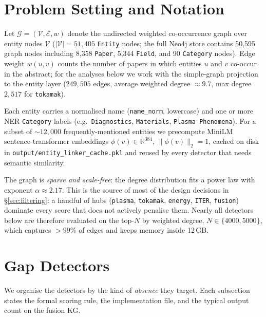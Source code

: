 \documentclass[11pt,a4paper]{article}
\newcommand{\KG}{\mathcal{G}}
\newcommand{\Entset}{\mathcal{E}}
\newcommand{\Vset}{\mathcal{V}}
\newcommand{\code}[1]{\texttt{\small #1}}
\begin{document}
\section{Problem Setting and Notation}
\label{sec:setup}

Let $\KG = (\Vset, \Entset, w)$ denote the undirected weighted co-occurrence graph over entity nodes $\Vset$ ($|\Vset|=51{,}405$ \code{Entity} nodes; the full Neo4j store contains 50{,}595 graph nodes including 8{,}358 \code{Paper}, 5{,}344 \code{Field}, and 90 \code{Category} nodes). Edge weight $w(u,v)$ counts the number of papers in which entities $u$ and $v$ co-occur in the abstract; for the analyses below we work with the simple-graph projection to the entity layer ($249{,}505$ edges, average weighted degree $\approx 9.7$, max degree $2{,}517$ for \code{tokamak}).

Each entity carries a normalised name (\code{name\_norm}, lowercase) and one or more NER \code{Category} labels (e.g.\ \code{Diagnostics}, \code{Materials}, \code{Plasma Phenomena}). For a subset of $\sim\!12{,}000$ frequently-mentioned entities we precompute MiniLM \citep{wang2020minilm} sentence-transformer embeddings $\phi(v)\in\mathbb{R}^{384}$, $\|\phi(v)\|_2=1$, cached on disk in \code{output/entity\_linker\_cache.pkl} and reused by every detector that needs semantic similarity.

The graph is \emph{sparse and scale-free}: the degree distribution fits a power law with exponent $\alpha\!\approx\!2.17$. This is the source of most of the design decisions in \S\ref{sec:filtering}: a handful of hubs (\code{plasma}, \code{tokamak}, \code{energy}, \code{ITER}, \code{fusion}) dominate every score that does not actively penalise them. Nearly all detectors below are therefore evaluated on the top-$N$ by weighted degree, $N\in\{4000,5000\}$, which captures $>\!99\%$ of edges and keeps memory inside 12\,GB.

\section{Gap Detectors}
\label{sec:detectors}

We organise the detectors by the kind of \emph{absence} they target. Each subsection states the formal scoring rule, the implementation file, and the typical output count on the fusion KG.
\end{document}
